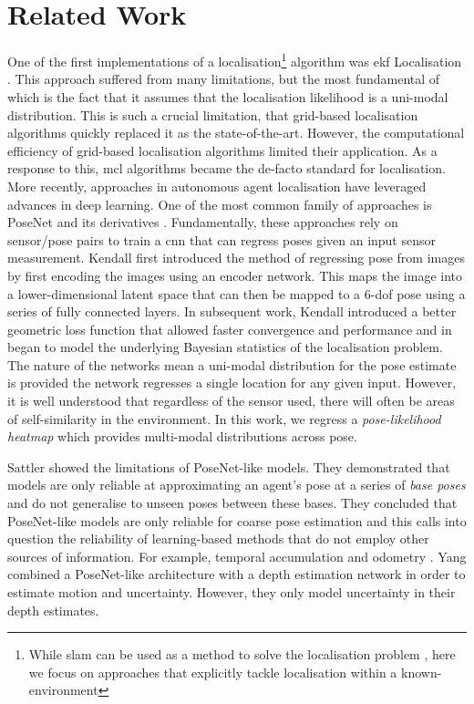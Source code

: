 \documentclass[letterpaper, 10 pt, conference]{ieeeconf}  %
\begin{document}
\section{Related Work}
One of the first implementations of a localisation\footnote{While \ac{slam} can be used as a method to solve the localisation problem \cite{Caselitz2016, Chu2016}, here we focus on approaches that explicitly tackle localisation within a known-environment} algorithm was \ac{ekf} Localisation \cite{Thrun2006ekf}.
This approach suffered from many limitations, but the most fundamental of which is the fact that it assumes that the localisation likelihood is a uni-modal distribution.
This is such a crucial limitation, that grid-based localisation \cite{simmons1995probabilistic, burgard1996estimating,lim2002grid} algorithms quickly replaced it as the state-of-the-art.
However, the computational efficiency of grid-based localisation algorithms limited their application.
As a response to this, \ac{mcl} algorithms \cite{Fox1999a,Dellaert1999} became the de-facto standard for localisation.
More recently, approaches in autonomous agent localisation have leveraged advances in deep learning.
One of the most common family of approaches is PoseNet \cite{Kendall2015Posenet} and its derivatives \cite{brahmbhatt2018geometry, Henriques2018mapnet, naseer2017deep, Walch17}.
Fundamentally, these approaches rely on sensor/pose pairs to train a \ac{cnn} that can regress poses given an input sensor measurement. 
Kendall \etal \cite{Kendall2015Posenet} first introduced the method of regressing pose from images by first encoding the images using an encoder network. 
This maps the image into a lower-dimensional latent space that can then be mapped to a 6-\ac{dof} pose using a series of fully connected layers. 
In subsequent work, Kendall \cite{kendall2017geometric} introduced a better geometric loss function that allowed faster convergence and performance and in \cite{kendall2016modelling} began to model the underlying Bayesian statistics of the localisation problem.
The nature of the networks mean a uni-modal distribution for the pose estimate is provided \ie the network regresses a single location for any given input.
However, it is well understood that regardless of the sensor used, there will often be areas of self-similarity in the environment. In this work, we regress a \textit{pose-likelihood heatmap} which provides multi-modal distributions across pose.

Sattler \etal \cite{sattler2019understanding} showed the limitations of PoseNet-like models.
They demonstrated that models are only reliable at approximating an agent's pose at a series of \textit{base poses} and do not generalise to unseen poses between these bases.
They concluded that PoseNet-like models are only reliable for coarse pose estimation and this calls into question the reliability of learning-based methods that do not employ other sources of information.
For example, temporal accumulation and odometry \cite{brahmbhatt2018geometry}.
Yang \etal \cite{yang2020d3vo} combined a PoseNet-like architecture with a depth estimation network in order to estimate motion and uncertainty.
However, they only model uncertainty in their depth estimates.
\end{document}
